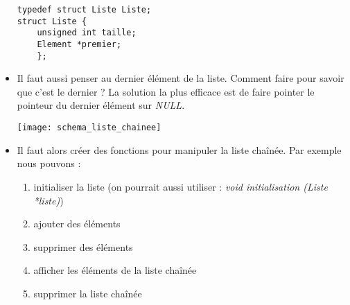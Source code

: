 \documentclass[12pt,a4paper]{article}
\begin{document}
\begin{itemize}
\begin{lstlisting}
typedef struct Liste Liste;
struct Liste {
	unsigned int taille; 
	Element *premier;
	};
\end{lstlisting}
\item Il faut aussi penser au dernier élément de la liste. Comment faire pour savoir que c'est le dernier ? La solution la plus efficace est de faire pointer le pointeur du dernier élément sur \textit{NULL}.
\begin{center}
\texttt{[image: schema\_liste\_chainee]}
\end{center}
\item Il faut alors créer des fonctions pour manipuler la liste chaînée. Par exemple nous pouvons :
\begin{enumerate}
\item initialiser la liste (on pourrait aussi utiliser : \textit{void initialisation (Liste *liste)})
\item ajouter des éléments
\item supprimer des éléments
\item afficher les éléments de la liste chaînée
\item supprimer la liste chaînée
\newline
 \begin{minipage}{\linewidth}
  \begin{figure}[H]
  \centering
    \hspace{1cm}
  \end{figure}
  \begin{figure}[H]
  \centering
    \hspace{1cm}
  \end{figure}
  \end{minipage}
\end{enumerate}

\end{itemize}
\end{document}
